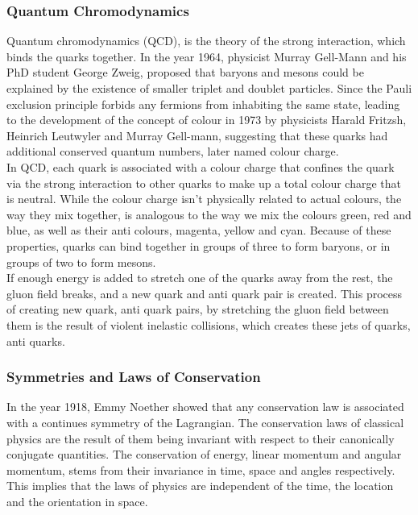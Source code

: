 \documentclass[12pt,a4paper]{article}
\numberwithin{equation}{section}
\begin{document}
\subsubsection{Quantum Chromodynamics}
Quantum chromodynamics (QCD), is the theory of the strong interaction, which
binds the quarks together. In the year 1964, physicist Murray Gell-Mann and his
PhD student George Zweig, proposed that baryons and mesons could be explained by
the existence of smaller triplet and doublet particles\cite{GELLMANN1964214}. Since the
Pauli exclusion principle forbids any fermions from inhabiting the same state,
leading to the development of the concept of colour in 1973\cite{FRITZSCH1973365}
by physicists Harald Fritzsh, Heinrich Leutwyler and Murray Gell-mann,
suggesting that these quarks had additional conserved
quantum numbers, later named colour charge.\\

In QCD, each quark is associated with a colour charge that confines the quark via
the strong interaction to other quarks to make up a total colour charge that is
neutral. While the colour charge isn't physically related to actual colours, the
way they mix together, is analogous to the way we mix the colours green, red and
blue, as well as their anti colours, magenta, yellow and cyan. Because of these
properties, quarks can bind together in groups of three to form baryons, or in
groups of two to form mesons.\\

If enough energy is added to stretch one of the quarks away from the rest, the
gluon field breaks, and a new quark and anti quark pair is created. This process
of creating new quark, anti quark pairs, by stretching the gluon field between
them is the result of violent inelastic collisions, which creates these jets of
quarks, anti quarks.\\

\subsubsection{Symmetries and Laws of Conservation}
In the year 1918, Emmy Noether showed that any conservation law is associated
with a continues symmetry of the Lagrangian\cite{Noether_1971}. The
conservation laws of classical physics are the result of them being invariant
with respect to their canonically conjugate quantities. The conservation of
energy, linear momentum and angular momentum, stems from their invariance in
time, space and angles respectively. This implies that the laws of physics are
independent of the time, the location and the orientation in space.\\
\end{document}

